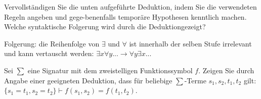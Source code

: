\documentclass[10pt, a4paper]{exam}
\begin{document}
\begin{questions}

    \question Vervollständigen Sie die unten aufgeführte Deduktion, indem Sie die verwendeten Regeln angeben und gege-benenfalls temporäre Hypothesen kenntlich machen. Welche syntaktische Folgerung wird durch die Deduktiongezeigt?
    \begin{solution}
        \begin{prooftree}
        \end{prooftree}

        Folgerung: die Reihenfolge von $\exists$ und $\forall$ ist innerhalb der selben Stufe irrelevant und kann vertauscht werden: $\exists x\forall y...\rightarrow \forall y\exists x...$
    \end{solution}

    \question Sei $\sum$ eine Signatur mit dem zweistelligen Funktionssymbol $f$. Zeigen Sie durch Angabe einer geeigneten Deduktion, dass für beliebige $\sum$-Terme $s_1,s_2,t_1,t_2$ gilt: $\{s_1=t_1,s_2=t_2\}\vdash f(s_1,s_2)=f(t_1,t_2)$.
    \begin{solution}

        \begin{prooftree}
        \end{prooftree}
    \end{solution}


\end{questions}
\end{document}
